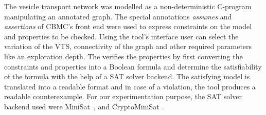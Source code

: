 %
%	
The vesicle transport network was modelled as a non-deterministic C-program manipulating an annotated graph. 
%
The special annotations \textit{assumes} and \textit{assertions} of CBMC's front end were used to express constraints on the model and properties to be checked. 
%
%		
Using the tool's interface user can select the variation of the VTS, connectivity of the graph and other required parameters like an exploration depth.
%
The {\sattool} verifies the properties by first converting the constraints and properties into a Boolean formula and determine the satisfiability of the formula with the help of a SAT solver backend.
%
The satisfying model is translated into a readable format and in case of a violation, the tool produces a readable counterexample.
For our experimentation purpose, the SAT solver backend used were MiniSat~\cite{sorensson2005minisat}, and CryptoMiniSat~\cite{soos2016cryptominisat}.


